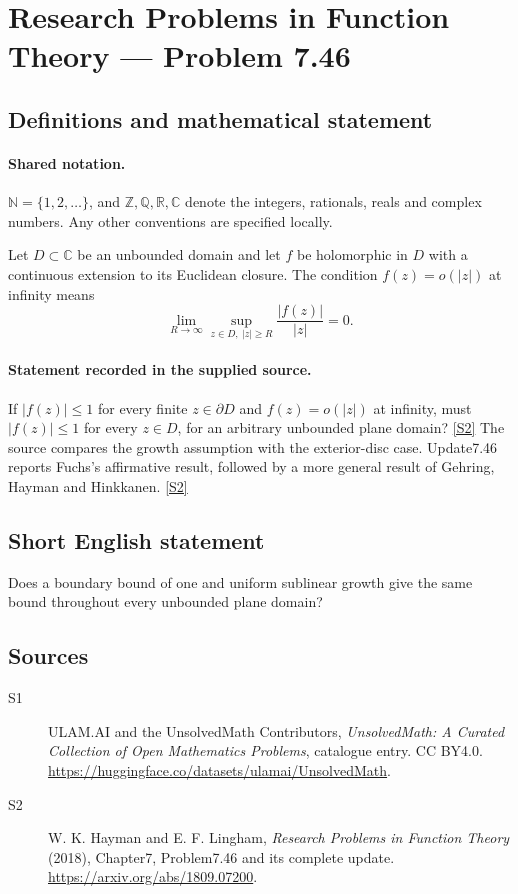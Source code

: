 \documentclass[11pt]{article}
\newcommand{\sref}[2]{\hyperlink{source:#1:#2}{[S#2]}}
\begin{document}
\section{Research Problems in Function Theory — Problem 7.46}\label{statement}

\subsection{Definitions and mathematical statement}

\paragraph{Shared notation.}$\mathbb N=\{1,2,\ldots\}$, and $\mathbb Z,\mathbb Q,\mathbb R,\mathbb C$ denote the integers, rationals, reals and complex numbers. Any other conventions are specified locally.


Let $D\subset\mathbb C$ be an unbounded domain and let $f$ be holomorphic in $D$ with a continuous extension to its Euclidean closure. The condition $f(z)=o(|z|)$ at infinity means
\[\lim_{R\to\infty}\sup_{z\in D,\ |z|\ge R}\frac{|f(z)|}{|z|}=0.\]

\paragraph{Statement recorded in the supplied source.}
If $|f(z)|\le1$ for every finite $z\in\partial D$ and $f(z)=o(|z|)$ at infinity, must $|f(z)|\le1$ for every $z\in D$, for an arbitrary unbounded plane domain? \sref{statement}{2}
The source compares the growth assumption with the exterior-disc case. Update7.46 reports Fuchs's affirmative result, followed by a more general result of Gehring, Hayman and Hinkkanen. \sref{statement}{2}
\subsection{Short English statement}
Does a boundary bound of one and uniform sublinear growth give the same bound throughout every unbounded plane domain?
\subsection{Sources}
\begin{description}
\item[\hypertarget{source:statement:1}{S1}] ULAM.AI and the UnsolvedMath Contributors, \emph{UnsolvedMath: A Curated Collection of Open Mathematics Problems}, catalogue entry. CC BY4.0. \url{https://huggingface.co/datasets/ulamai/UnsolvedMath}.
\item[\hypertarget{source:statement:2}{S2}] W. K. Hayman and E. F. Lingham, \emph{Research Problems in Function Theory} (2018), Chapter7, Problem7.46 and its complete update. \url{https://arxiv.org/abs/1809.07200}.
\end{description}
\label{end:statement}
\end{document}
